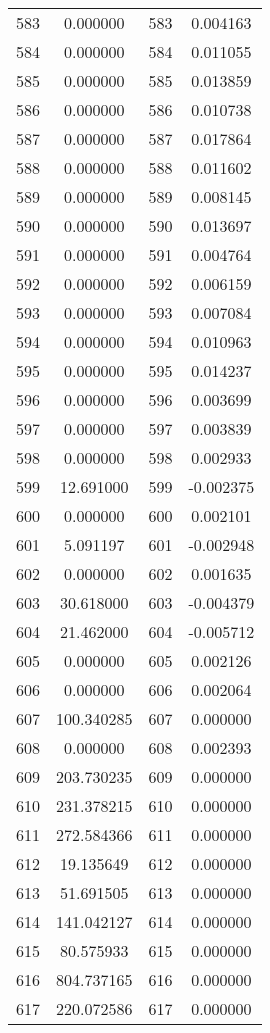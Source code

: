 \documentclass[12pt]{article}
\begin{document}
\begin{longtable}{@{}cccc@{}}
583 & 0.000000 & 583 & 0.004163 \\
584 & 0.000000 & 584 & 0.011055 \\
585 & 0.000000 & 585 & 0.013859 \\
586 & 0.000000 & 586 & 0.010738 \\
587 & 0.000000 & 587 & 0.017864 \\
588 & 0.000000 & 588 & 0.011602 \\
589 & 0.000000 & 589 & 0.008145 \\
590 & 0.000000 & 590 & 0.013697 \\
591 & 0.000000 & 591 & 0.004764 \\
592 & 0.000000 & 592 & 0.006159 \\
593 & 0.000000 & 593 & 0.007084 \\
594 & 0.000000 & 594 & 0.010963 \\
595 & 0.000000 & 595 & 0.014237 \\
596 & 0.000000 & 596 & 0.003699 \\
597 & 0.000000 & 597 & 0.003839 \\
598 & 0.000000 & 598 & 0.002933 \\
599 & 12.691000 & 599 & -0.002375 \\
600 & 0.000000 & 600 & 0.002101 \\
601 & 5.091197 & 601 & -0.002948 \\
602 & 0.000000 & 602 & 0.001635 \\
603 & 30.618000 & 603 & -0.004379 \\
604 & 21.462000 & 604 & -0.005712 \\
605 & 0.000000 & 605 & 0.002126 \\
606 & 0.000000 & 606 & 0.002064 \\
607 & 100.340285 & 607 & 0.000000 \\
608 & 0.000000 & 608 & 0.002393 \\
609 & 203.730235 & 609 & 0.000000 \\
610 & 231.378215 & 610 & 0.000000 \\
611 & 272.584366 & 611 & 0.000000 \\
612 & 19.135649 & 612 & 0.000000 \\
613 & 51.691505 & 613 & 0.000000 \\
614 & 141.042127 & 614 & 0.000000 \\
615 & 80.575933 & 615 & 0.000000 \\
616 & 804.737165 & 616 & 0.000000 \\
617 & 220.072586 & 617 & 0.000000 \\

\end{longtable}
\end{document}
